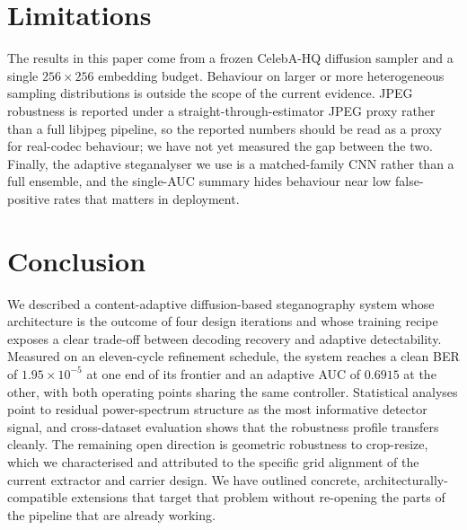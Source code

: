 \documentclass[journal]{IEEEtran}
\begin{document}
\section{Limitations}
\label{sec:limits}
The results in this paper come from a frozen CelebA-HQ diffusion
sampler and a single $256{\times}256$ embedding budget. Behaviour on
larger or more heterogeneous sampling distributions is outside the
scope of the current evidence. JPEG robustness is reported under a
straight-through-estimator JPEG proxy rather than a full libjpeg
pipeline, so the reported numbers should be read as a proxy for
real-codec behaviour; we have not yet measured the gap between the
two. Finally, the adaptive steganalyser we use is a matched-family
CNN rather than a full ensemble, and the single-AUC summary hides
behaviour near low false-positive rates that matters in deployment.

\section{Conclusion}
\label{sec:conclusion}
We described a content-adaptive diffusion-based steganography system
whose architecture is the outcome of four design iterations and
whose training recipe exposes a clear trade-off between decoding
recovery and adaptive detectability. Measured on an eleven-cycle
refinement schedule, the system reaches a clean BER of
$1.95\!\times\!10^{-5}$ at one end of its frontier and an adaptive
AUC of $0.6915$ at the other, with both operating points sharing the
same controller. Statistical analyses point to residual
power-spectrum structure as the most informative detector signal,
and cross-dataset evaluation shows that the robustness profile
transfers cleanly. The remaining open direction is geometric
robustness to crop-resize, which we characterised and attributed to
the specific grid alignment of the current extractor and carrier
design. We have outlined concrete, architecturally-compatible
extensions that target that problem without re-opening the parts of
the pipeline that are already working.
\end{document}
